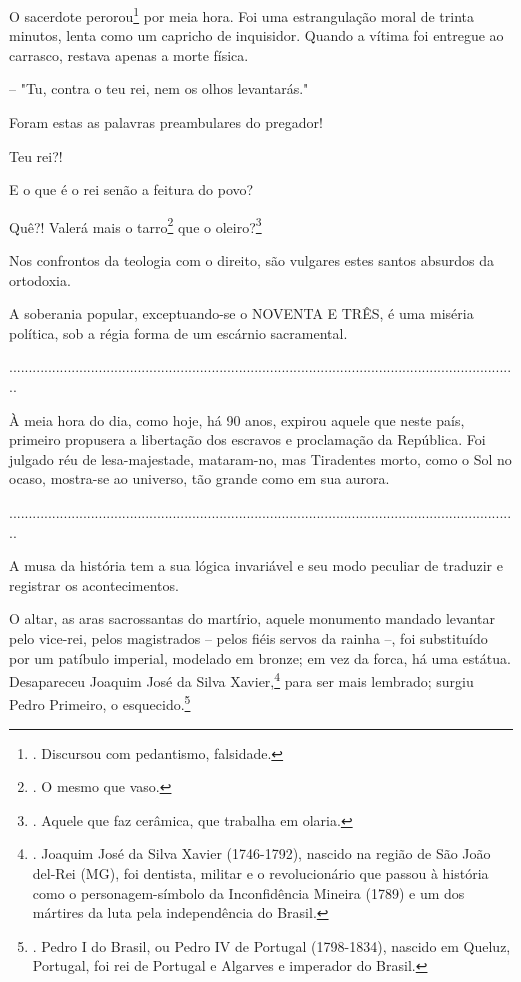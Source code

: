 O sacerdote perorou\footnote{. Discursou com pedantismo, falsidade.} por
meia hora. Foi uma estrangulação moral de trinta minutos, lenta como um
capricho de inquisidor. Quando a vítima foi entregue ao carrasco,
restava apenas a morte física.

-- "Tu, contra o teu rei, nem os olhos levantarás."

Foram estas as palavras preambulares do pregador!

Teu rei?!

E o que é o rei senão a feitura do povo?

Quê?! Valerá mais o tarro\footnote{. O mesmo que vaso.} que o
oleiro?\footnote{. Aquele que faz cerâmica, que trabalha em olaria.}

Nos confrontos da teologia com o direito, são vulgares estes santos
absurdos da ortodoxia.

A soberania popular, exceptuando-se o NOVENTA E TRÊS, é uma miséria
política, sob a régia forma de um escárnio sacramental.

...................................................................................................................................

À meia hora do dia, como hoje, há 90 anos, expirou aquele que neste
país, primeiro propusera a libertação dos escravos e proclamação da
República. Foi julgado réu de lesa-majestade, mataram-no, mas Tiradentes
morto, como o Sol no ocaso, mostra-se ao universo, tão grande como em
sua aurora.

...................................................................................................................................

A musa da história tem a sua lógica invariável e seu modo peculiar de
traduzir e registrar os acontecimentos.

O altar, as aras sacrossantas do martírio, aquele monumento mandado
levantar pelo vice-rei, pelos magistrados -- pelos fiéis servos da
rainha --, foi substituído por um patíbulo imperial, modelado em bronze;
em vez da forca, há uma estátua. Desapareceu Joaquim José da Silva
Xavier,\footnote{. Joaquim José da Silva Xavier (1746-1792), nascido na
  região de São João del-Rei (MG), foi dentista, militar e o
  revolucionário que passou à história como o personagem-símbolo da
  Inconfidência Mineira (1789) e um dos mártires da luta pela
  independência do Brasil.} para ser mais lembrado; surgiu Pedro
Primeiro, o esquecido.\footnote{. Pedro I do Brasil, ou Pedro IV de
  Portugal (1798-1834), nascido em Queluz, Portugal, foi rei de Portugal
  e Algarves e imperador do Brasil.}

